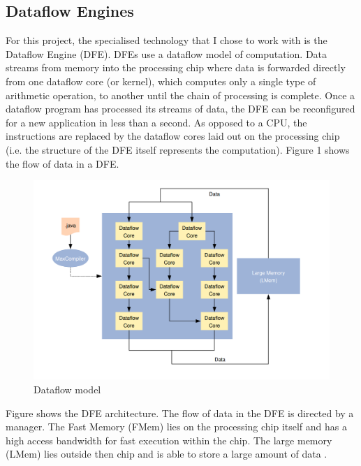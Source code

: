 \documentclass[a4paper,11pt]{article}
\begin{document}
\subsection{Dataflow Engines}
For this project, the specialised technology that I chose to work with is the Dataflow Engine (DFE). DFEs use a dataflow model of computation. Data streams from memory into the processing chip where data is forwarded directly from one dataflow core (or kernel), which computes only a single type of arithmetic operation, to another until the chain of processing is complete. Once a dataflow program has processed its streams of data, the DFE can be reconfigured for a new application in less than a second. As opposed to a CPU, the instructions are replaced by the dataflow cores laid out on the processing chip (i.e. the structure of the DFE itself represents the computation). Figure 1 shows the flow of data in a DFE.

\begin{figure}[H]
	\centering
	\includegraphics[scale=0.5]{images/DFE}
	\caption{Dataflow model\cite{maxeler}}
\end{figure}

\noindent Figure shows the DFE architecture. The flow of data in the DFE is directed by a manager. The Fast Memory (FMem) lies on the processing chip itself and has a high access bandwidth for fast execution within the chip. The large memory (LMem) lies outside then chip and is able to store a large amount of data \cite{dataflow}. 
\end{document}
